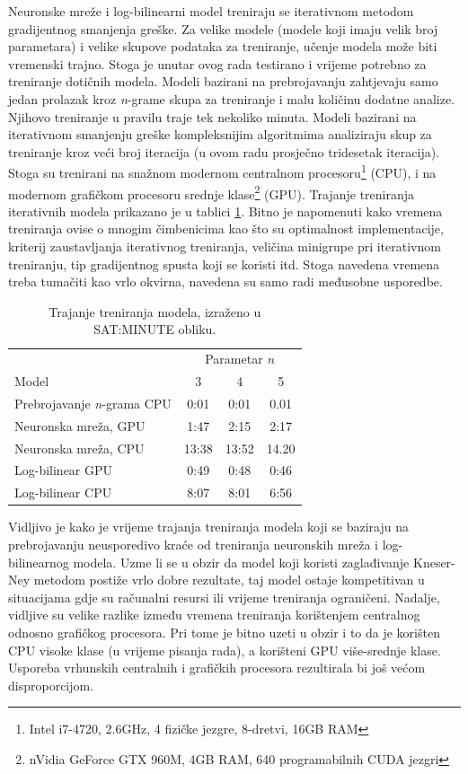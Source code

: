 \documentclass[times, utf8, diplomski, numeric]{fer}
\begin{document}
Neuronske mreže i log-bilinearni model treniraju se iterativnom metodom gradijentnog smanjenja greške. Za velike modele (modele koji imaju velik broj parametara) i velike skupove podataka za treniranje, učenje modela može biti vremenski trajno. Stoga je unutar ovog rada testirano i vrijeme potrebno za treniranje dotičnih modela. Modeli bazirani na prebrojavanju zahtjevaju samo jedan prolazak kroz \textit{n}-grame skupa za treniranje i malu količinu dodatne analize. Njihovo treniranje u pravilu traje tek nekoliko minuta. Modeli bazirani na iterativnom smanjenju greške kompleksnijim algoritmima analiziraju skup za treniranje kroz veći broj iteracija (u ovom radu prosječno tridesetak iteracija). Stoga su trenirani na snažnom modernom centralnom procesoru\footnote{Intel i7-4720, 2.6GHz, 4 fizičke jezgre, 8-dretvi, 16GB RAM} (CPU), i na modernom grafičkom procesoru srednje klase\footnote{nVidia GeForce GTX 960M, 4GB RAM, 640 programabilnih CUDA jezgri} (GPU). Trajanje treniranja iterativnih modela prikazano je u tablici \ref{tbl:eval_time}. Bitno je napomenuti kako vremena treniranja ovise o mnogim čimbenicima kao što su optimalnost implementacije, kriterij zaustavljanja iterativnog treniranja, veličina minigrupe pri iterativnom treniranju, tip gradijentnog spusta koji se koristi itd. Stoga navedena vremena treba tumačiti kao vrlo okvirna, navedena su samo radi međusobne usporedbe.

\begin{table}[htb]
\caption{Trajanje treniranja modela, izraženo u SAT:MINUTE obliku.}
\label{tbl:eval_time}
\centering
\begin{tabular}{lccc}
\toprule
 & \multicolumn{3}{c}{Parametar \textit{n}} \\
\cmidrule(r){2-4}
Model & 3 & 4 & 5 \\
\midrule
Prebrojavanje \textit{n}-grama CPU &  0:01 & 0:01 & 0.01 \\
Neuronska mreža, GPU & 1:47 & 2:15 & 2:17 \\
Neuronska mreža, CPU & 13:38 & 13:52 & 14.20 \\
Log-bilinear GPU & 0:49 & 0:48 & 0:46 \\
Log-bilinear CPU & 8:07 & 8:01 & 6:56 \\
\bottomrule
\end{tabular}
\end{table}


Vidljivo je kako je vrijeme trajanja treniranja modela koji se baziraju na prebrojavanju neusporedivo kraće od treniranja neuronskih mreža i log-bilinearnog modela. Uzme li se u obzir da model koji koristi zaglađivanje Kneser-Ney metodom postiže vrlo dobre rezultate, taj model ostaje kompetitivan u situacijama gdje su računalni resursi ili vrijeme treniranja ograničeni. Nadalje, vidljive su velike razlike između vremena treniranja korištenjem centralnog odnosno grafičkog procesora. Pri tome je bitno uzeti u obzir i to da je korišten CPU visoke klase (u vrijeme pisanja rada), a korišteni GPU više-srednje klase. Usporeba vrhunskih centralnih i grafičkih procesora rezultirala bi još većom disproporcijom.
\end{document}
